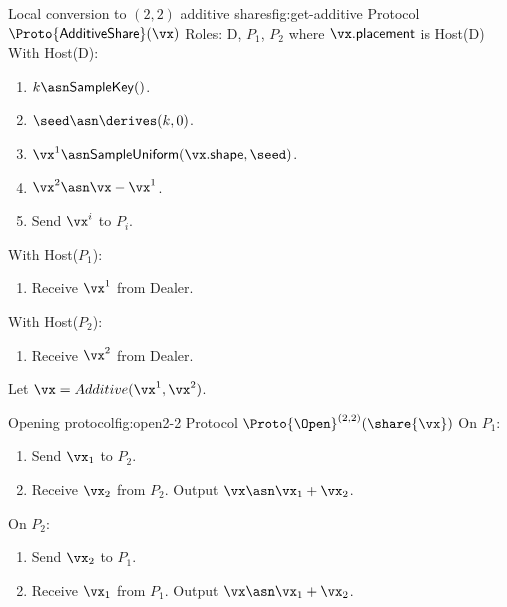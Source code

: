 \begin{Boxfig}{Local conversion to $(2,2)$ additive shares}{fig:get-additive}
  {Protocol $\Proto{\mathsf{AdditiveShare}}(\vx)$}
  Roles: D, $P_1$, $P_2$ where $\vx.\mathsf{placement}$ is Host(D) \newline
  With Host(D):
  \begin{enumerate}
    \item $k \asn \mathsf{SampleKey}()$.
    \item $\seed \asn \derives(k, 0)$.
    \item $\vx^1 \asn \mathsf{SampleUniform}(\vx.\mathsf{shape}, \seed)$.
    \item $\vx^2 \asn \vx - \vx^1$.
    \item Send $\vx^i$ to $P_i$.
  \end{enumerate}
  With Host($P_1$):
  \begin{enumerate}
      \item Receive $\vx^1$ from Dealer.
  \end{enumerate}
  With Host($P_2$):
  \begin{enumerate}
      \item Receive $\vx^2$ from Dealer.
  \end{enumerate}
  Let $\vx = Additive(\vx^1, \vx^2)$.
\end{Boxfig}

\begin{Boxfig}{Opening protocol}{fig:open2-2}
  {Protocol $\Proto{\Open}^{(2,2)}(\share{\vx})$}
  On $P_1$:
  \begin{enumerate}
    \item Send $\vx_1$ to $P_2$.
    \item Receive $\vx_2$ from $P_2$. Output $\vx \asn \vx_1 + \vx_2$.
  \end{enumerate}
   On $P_2$:
  \begin{enumerate}
    \item Send $\vx_2$ to $P_1$.
    \item Receive $\vx_1$ from $P_1$. Output $\vx \asn \vx_1 + \vx_2$.
  \end{enumerate}
\end{Boxfig}


